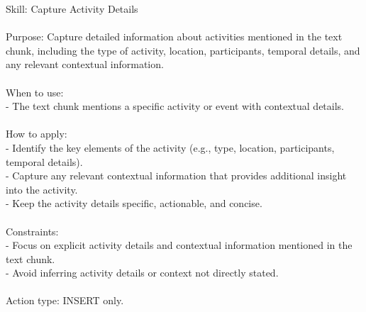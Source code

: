 \begin{center}
\begin{tcolorbox}[
  title={Evolved Skill on LoCoMo - CAPTURE\_ACTIVITY\_DETAILS},
  colback=blue!2!white,
  colframe=blue!35!black,
  colbacktitle=blue!15!white,
  coltitle=black,
  coltext=black
]
{
Skill: Capture Activity Details \\\\
Purpose: Capture detailed information about activities mentioned in the text chunk, including the type of activity, location, participants, temporal details, and any relevant contextual information. \\\\
When to use: \\
- The text chunk mentions a specific activity or event with contextual details. \\\\
How to apply: \\
- Identify the key elements of the activity (e.g., type, location, participants, temporal details). \\
- Capture any relevant contextual information that provides additional insight into the activity. \\
- Keep the activity details specific, actionable, and concise. \\\\
Constraints: \\
- Focus on explicit activity details and contextual information mentioned in the text chunk. \\
- Avoid inferring activity details or context not directly stated. \\\\
Action type: INSERT only.
}
\label{appendix:case_capture_activity_details}
\end{tcolorbox}
\end{center}

